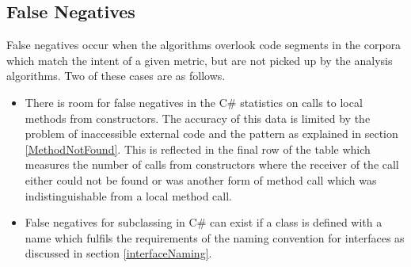 \subsection{False Negatives}
False negatives occur when the algorithms overlook code segments in the corpora which match the intent of a given metric, but are not picked up by the analysis algorithms. Two of these cases are as follows.
\begin{itemize}
	\item There is room for false negatives in the C\# statistics on calls to local methods from constructors. The accuracy of this data is limited by the problem of inaccessible external code and the  pattern as explained in section \ref{MethodNotFound}. This is reflected in the final row of the table which measures the number of calls from constructors where the receiver of the call either could not be found or was another form of method call which was indistinguishable from a local method call.
	\item False negatives for subclassing in C\# can exist if a class is defined with a name which fulfils the requirements of the naming convention for interfaces as discussed in section \ref{interfaceNaming}.
\end{itemize}










